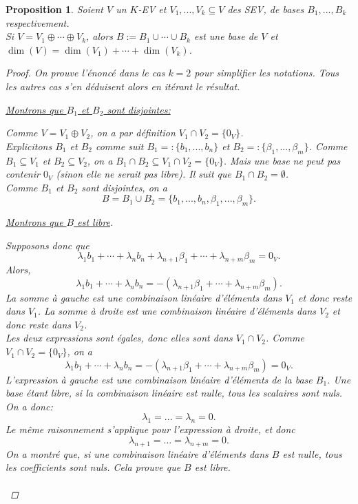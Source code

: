 \documentclass[oneside,12pt,french,table]{book}
\newtheorem{prop}{Proposition}[section]
\theoremstyle{definition}
\theoremstyle{definition}
\theoremstyle{definition}
\begin{document}
\begin{prop}
Soient $V$ un $K$-EV et $V_1,...,V_k \subseteq V$ des SEV, de bases $B_1,...,B_k$ respectivement. \\
Si $V = V_1 \oplus \cdots \oplus V_k$, alors $B := B_1 \cup \cdots \cup B_k$ est une base de $V$ et $\dim(V) = \dim(V_1) + \cdots + \dim(V_k)$.
\begin{proof} On prouve l'énoncé dans le cas $k=2$ pour simplifier les notations. Tous les autres cas s'en déduisent alors en itérant le résultat. \par
\underline{Montrons que $B_1$ et $B_2$ sont disjointes:}
\par
Comme $V = V_1 \oplus V_2$, on a par définition $V_1 \cap V_2 = \{ 0_V \}$. \\
Explicitons $B_1$ et $B_2$ comme suit $B_1 =: \{ b_1,...,b_n \}$ et $B_2 =: \{ \beta_1,...,\beta_m \}$. 
Comme $B_1 \subseteq V_1$ et $B_2 \subseteq V_2$, on a $B_1 \cap B_2 \subseteq V_1 \cap V_2 = \{ 0_V \}$. Mais une base ne peut pas contenir $0_V$ (sinon elle ne serait pas libre). Il suit que $B_1 \cap B_2 = \emptyset$. \\
Comme $B_1$ et $B_2$ sont disjointes, on a $$B = B_1 \cup B_2 = \{ b_1,...,b_n,\beta_1,...,\beta_m \}.$$
\par
\underline{Montrons que $B$ est libre}. 
\par 
Supposons donc que $$\lambda_1 b_1 + \cdots + \lambda_n b_n + \lambda_{n+1} \beta_1 + \cdots + \lambda_{n+m} \beta_m = 0_V.$$
Alors, $$\lambda_1 b_1 + \cdots + \lambda_n b_n = -( \lambda_{n+1} \beta_1 + \cdots + \lambda_{n+m} \beta_m).$$
La somme à gauche est une combinaison linéaire d'éléments dans $V_1$ et donc reste dans $V_1$. La somme à droite est une combinaison linéaire d'éléments dans $V_2$ et donc reste dans $V_2$. \\Les deux expressions sont égales, donc elles sont
dans $V_1 \cap V_2$. Comme $V_1 \cap V_2 = \{ 0_V \}$, on a
$$\lambda_1 b_1 + \cdots + \lambda_n b_n = -( \lambda_{n+1} \beta_1 + \cdots + \lambda_{n+m} \beta_m) = 0_V.$$
L'expression à gauche est une combinaison linéaire d'éléments de la base $B_1$. Une base étant libre, si la combinaison linéaire est nulle, tous les scalaires sont nuls. On a donc:
$$\lambda_1 = ... = \lambda_n = 0.$$
Le même raisonnement s'applique pour l'expression à droite, et donc
$$\lambda_{n+1} = ... = \lambda_{n+m} = 0.$$
On a montré que, si une combinaison linéaire d'éléments dans $B$ est nulle, tous les coefficients sont nuls. Cela prouve que $B$ est libre. \\ \\

\end{proof}
\end{prop}
\end{document}
